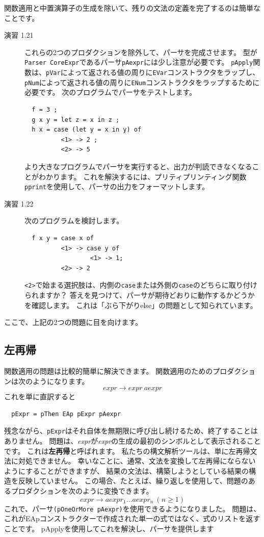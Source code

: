 \documentclass{jbook}
\begin{document}
関数適用と中置演算子の生成を除いて、残りの文法の定義を完了するのは簡単なことです。

\begin{description}
	\item[演習 1.21] これらの2つのプロダクションを除外して、パーサを完成させます。
		型が\texttt{Parser CoreExpr}であるパーサ\texttt{pAexpr}には少し注意が必要です。
		\texttt{pApply}関数は、\texttt{pVar}によって返される値の周りに\texttt{EVar}コンストラクタをラップし、
		\texttt{pNum}によって返される値の周りに\texttt{ENum}コンストラクタをラップするために必要です。
		次のプログラムでパーサをテストします。

		\begin{verbatim}
  f = 3 ;
  g x y = let z = x in z ;
  h x = case (let y = x in y) of
          <1> -> 2 ;
          <2> -> 5
\end{verbatim}

		より大きなプログラムでパーサを実行すると、出力が判読できなくなることがわかります。
		これを解決するには、プリティプリンティング関数\texttt{pprint}を使用して、パーサの出力をフォーマットします。
	\item[演習 1.22] 次のプログラムを検討します。

		\begin{verbatim}
  f x y = case x of
          <1> -> case y of
                  <1> -> 1;
          <2> -> 2
\end{verbatim}

		\texttt{<2>}で始まる選択肢は、内側の\texttt{case}または外側の\texttt{case}のどちらに取り付けられますか？
		答えを見つけて、パーサが期待どおりに動作するかどうかを確認します。
		これは「ぶら下がりelse」の問題として知られています。
\end{description}

ここで、上記の2つの問題に目を向けます。

\subsection{左再帰}

関数適用の問題は比較的簡単に解決できます。
関数適用のためのプロダクションは次のようになります。
\[ expr \rightarrow expr ~ aexpr \]
これを単に直訳すると

\begin{verbatim}
  pExpr = pThen EAp pExpr pAexpr
\end{verbatim}

残念ながら、\texttt{pExpr}はそれ自体を無期限に呼び出し続けるため、終了することはありません。
問題は、\textit{expr}が\textit{expr}の生成の最初のシンボルとして表示されることです。
これは\textbf{左再帰}と呼ばれます。
私たちの構文解析ツールは、単に左再帰文法に対処できません。
幸いなことに、通常、文法を変換して左再帰にならないようにすることができますが、
結果の文法は、構築しようとしている結果の構造を反映していません。
この場合、たとえば、繰り返しを使用して、問題のあるプロダクションを次のように変換できます。
\[ expr \rightarrow aexpr_1 \ldots aexpr_n ~ (n \geq 1) \]
これで、パーサ\texttt{(pOneOrMore pAexpr)}を使用できるようになりました。
問題は、これがEApコンストラクターで作成された単一の式ではなく、式のリストを返すことです。
pApplyを使用してこれを解決し、パーサを提供します
\end{document}
